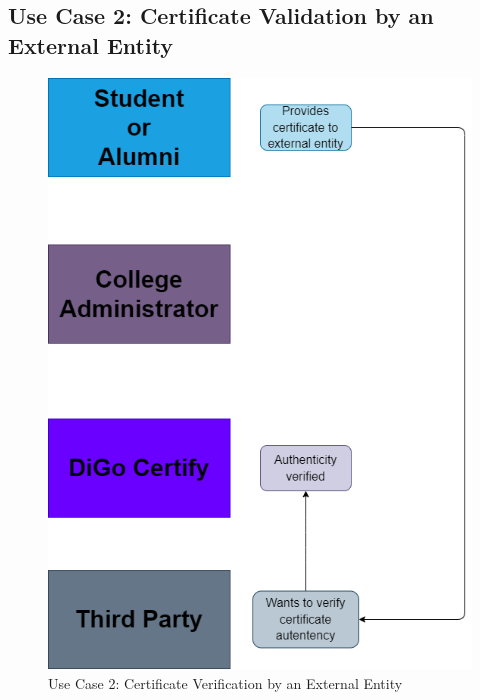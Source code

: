 \subsection{Use Case 2: Certificate Validation by an External Entity}

\begin{figure}[H]
    \centering
    \includegraphics[height=0.6\textwidth, keepaspectratio]{../diagrams/certificate-validation.drawio.png}
    \caption{Use Case 2: Certificate Verification by an External Entity}
    \label{fig:use-case-2}
\end{figure}

